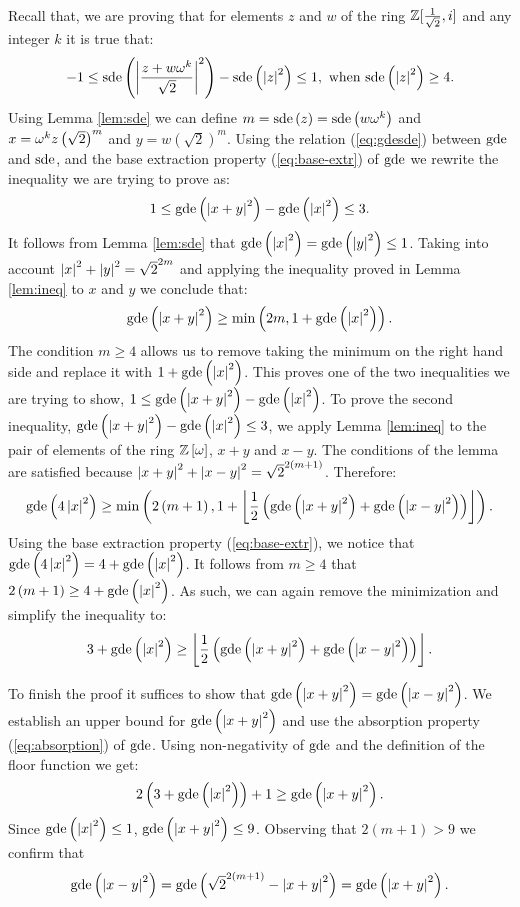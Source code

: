 \documentclass[english,journal]{extarticle}
\makeatletter
\theoremstyle{plain}
\theoremstyle{plain}
\theoremstyle{plain}
\theoremstyle{definition}
\theoremstyle{plain}
\newenvironment{proof}[1][\proofname]{\par
     \normalfont\topsep6\p@\@plus6\p@\relax
     \trivlist
     \itemindent\parindent
     \item[\hskip\labelsep
           \scshape
       #1]\ignorespaces
   }{%
     \endtrivlist\@endpefalse
   }
\providecommand{\proofname}{Proof}
\theoremstyle{plain}
\makeatother
\begin{document}
\begin{proof}
Recall that, we are proving that for elements $z$ and $w$ of the ring $\mathbb{Z}[\frac{1}{\sqrt{2}},i]$ and any
integer $k$ it is true that: 
\[
-1\le\mathrm{sde}\left(\left|\frac{z+w\omega^{k}}{\sqrt{2}}\right|^{2}\right)-\mathrm{sde}\left(\left|z\right|^{2}\right)\le 1,\mbox{ when }\mathrm{sde}\left(\left|z\right|^{2}\right)\ge 4.
\]
Using Lemma \ref{lem:sde} we can define
$m=\mathrm{sde}\left(z\right)=\mathrm{sde}\left(w\omega^{k}\right)$
and $x=\omega^{k}z\left(\sqrt{2}\right)^{m}$ and
$y=w\left(\sqrt{2}\right)^{m}$.
Using the relation (\ref{eq:gdesde}) between $\mathbf{\mathrm{gde}}$ and $\mathrm{sde}$, and
the base extraction property (\ref{eq:base-extr}) of $\mathbf{\mathrm{gde}}$ we rewrite
the inequality we are trying to prove as: 
\[
1\le\mathbf{\mathrm{gde}}\left(\left|x+y\right|^{2}\right)-\mathbf{\mathrm{gde}}\left(\left|x\right|^{2}\right)\le 3.
\]
It follows from Lemma \ref{lem:sde} that $\mathbf{\mathrm{gde}}\left(\left|x\right|^{2}\right)=\mathbf{\mathrm{gde}}\left(\left|y\right|^{2}\right)\le 1$.
Taking into account $\left|x\right|^{2}+\left|y\right|^{2}=\sqrt{2}^{2m}$ and applying
the inequality proved in Lemma \ref{lem:ineq} to $x$ and $y$ we conclude
that: 
\[
\mathbf{\mathrm{gde}}\left(\left|x+y\right|^{2}\right)\ge\min\left(2m,1+\mathbf{\mathrm{gde}}\left(\left|x\right|^{2}\right)\right).
\]
The condition $m\ge 4$ allows us to remove taking the minimum on the right hand side and replace it with $1+\mathbf{\mathrm{gde}}\left(\left|x\right|^{2}\right)$. 
This proves one of the two inequalities we are trying to show, $1\le\mathbf{\mathrm{gde}}\left(\left|x+y\right|^{2}\right)-\mathbf{\mathrm{gde}}\left(\left|x\right|^{2}\right)$.
To prove the second inequality, $\mathbf{\mathrm{gde}}\left(\left|x+y\right|^{2}\right)-\mathbf{\mathrm{gde}}\left(\left|x\right|^{2}\right)\le 3$,
we apply Lemma \ref{lem:ineq} to the pair of elements of the ring $\mathbb{Z}\left[\omega\right]$, $x+y$ and $x-y$.  The conditions of the
lemma are satisfied because $\left|x+y\right|^2+\left|x-y\right|^2=\sqrt{2}^{2\left(m+1\right)}$.
Therefore: 
\[
\mathbf{\mathrm{gde}}\left(4\left|x\right|^{2}\right)\ge\min\left(2\left(m+1\right),1+\left\lfloor
\frac{1}{2}\left(\mathbf{\mathrm{gde}}\left(\left|x+y\right|^{2}\right)+\mathbf{\mathrm{gde}}\left(\left|x-y\right|^{2}
\right)\right)\right\rfloor \right).
\]
Using the base extraction property (\ref{eq:base-extr}), we notice
that $\mathbf{\mathrm{gde}}\left(4\left|x\right|^{2}\right)=4+\mathbf{\mathrm{gde}}\left(\left|x\right|^{2}\right)$.
It follows from $m\ge 4$ that $2\left(m+1\right)\ge 4+\mathbf{\mathrm{gde}}\left(\left|x\right|^{2}\right)$.
As such, we can again remove the minimization and simplify the inequality
to: 
\[
3+\mathbf{\mathrm{gde}}\left(\left|x\right|^{2}\right)\ge\left\lfloor
\frac{1}{2}\left(\mathbf{\mathrm{gde}}\left(\left|x+y\right|^{2}\right)+\mathbf{\mathrm{gde}}\left(\left|x-y\right|^{2}
\right)\right)\right\rfloor .
\]

To finish the proof it suffices to show that
$\mathbf{\mathrm{gde}}\left(\left|x+y\right|^{2}\right)=\mathbf{\mathrm{gde}}\left(\left|x-y\right|^{2}\right)$.
We establish an upper bound for $\mathbf{\mathrm{gde}}\left(\left|x+y\right|^{2}\right)$
and use the absorption property (\ref{eq:absorption}) of $\mathbf{\mathrm{gde}}$.
Using non-negativity of $\mathbf{\mathrm{gde}}$ and the definition of the floor function
we get: 
\[
2\left(3+\mathbf{\mathrm{gde}}\left(\left|x\right|^{2}\right)\right)+1\ge\mathbf{\mathrm{gde}}\left(\left|x+y\right|^{2}\right).
\]
Since $\mathbf{\mathrm{gde}}\left(\left|x\right|^2\right) \leq 1$, $\mathbf{\mathrm{gde}}\left(\left|x+y\right|^{2}\right)\le 9$.  Observing that $2\left(m+1\right)>9$
we confirm that 
\[
\mathbf{\mathrm{gde}}\left(\left|x-y\right|^{2}\right)=\mathbf{\mathrm{gde}}\left(\sqrt{2}^{2\left(m+1\right)}-\left|x+y\right|^
{2}\right)=\mathbf{\mathrm{gde}}\left(\left|x+y\right|^{2}\right).
\]
\end{proof}
\end{document}
